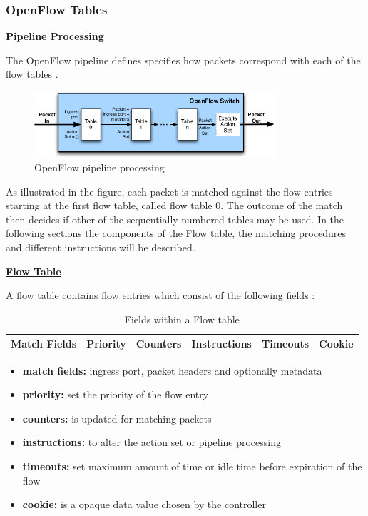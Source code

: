 \subsubsection{OpenFlow Tables}

\textbf{\underline{Pipeline Processing}}

The OpenFlow pipeline defines specifies how packets correspond with each of the flow tables \cite{ofspecification}. 

\begin{figure}[H]
\centering
\includegraphics[width=0.8\textwidth]{images/fundamentals/openflow_pipeline_processing.png}
\caption{OpenFlow pipeline processing}
\end{figure}

As illustrated in the figure, each packet is matched against the flow entries starting at the first flow table, called flow table 0. The outcome of the match then decides if other of the sequentially numbered tables may be used. In the following sections the components of the Flow table, the matching procedures and different instructions will be described.


\textbf{\underline{Flow Table}}

A flow table contains flow entries which consist of the following fields \cite{ofspecification}: 

\begin{table}[H]
\centering

\begin{tabular}{|c|c|c|c|c|c|}
\hline Match Fields & Priority & Counters & Instructions & Timeouts & Cookie \\ 
\hline 
\end{tabular} 

\caption{Fields within a Flow table}
\end{table}

\begin{itemize}
\item \textbf{match fields:} ingress port, packet headers and optionally metadata
\item \textbf{priority:} set the priority of the flow entry
\item \textbf{counters:} is updated for matching packets
\item \textbf{instructions:} to alter the action set or pipeline processing
\item \textbf{timeouts:} set maximum amount of time or idle time before expiration of the flow
\item \textbf{cookie:} is a opaque data value chosen by the controller
\end{itemize}

